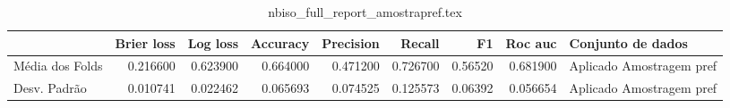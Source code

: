 \begin{table}
\centering
\caption{nbiso_full_report_amostrapref.tex}
\label{nbiso_full_report_amostrapref.tex}
\begin{tabular}{lrrrrrrrl}
\toprule
{} &  Brier  loss &  Log loss &  Accuracy  &  Precision  &   Recall  &      F1  &  Roc auc  &         Conjunto de dados \\
\midrule
Média dos Folds &     0.216600 &  0.623900 &   0.664000 &    0.471200 &  0.726700 &  0.56520 &  0.681900 &  Aplicado Amostragem pref \\
Desv. Padrão    &     0.010741 &  0.022462 &   0.065693 &    0.074525 &  0.125573 &  0.06392 &  0.056654 &  Aplicado Amostragem pref \\
\bottomrule
\end{tabular}
\end{table}
